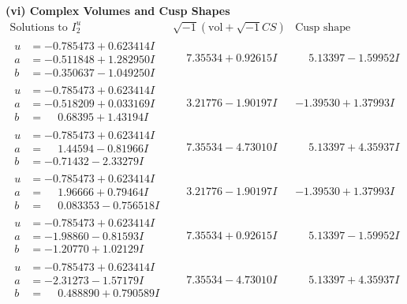 \documentclass[1p]{elsarticle_modified}
\theoremstyle{definition}
\newcommand{\I}{\sqrt{-1}}
\begin{document}
\newpage\flushleft \textbf{(vi) Complex Volumes and Cusp Shapes}
$$\begin{array}{c|c|c}  
\text{Solutions to }I^u_{2}& \I (\text{vol} + \sqrt{-1}CS) & \text{Cusp shape}\\
 \hline 
\begin{aligned}
u &= -0.785473 + 0.623414 I \\
a &= -0.511848 + 1.282950 I \\
b &= -0.350637 - 1.049250 I\end{aligned}
 & \phantom{-}7.35534 + 0.92615 I & \phantom{-}5.13397 - 1.59952 I \\ \hline\begin{aligned}
u &= -0.785473 + 0.623414 I \\
a &= -0.518209 + 0.033169 I \\
b &= \phantom{-}0.68395 + 1.43194 I\end{aligned}
 & \phantom{-}3.21776 - 1.90197 I & -1.39530 + 1.37993 I \\ \hline\begin{aligned}
u &= -0.785473 + 0.623414 I \\
a &= \phantom{-}1.44594 - 0.81966 I \\
b &= -0.71432 - 2.33279 I\end{aligned}
 & \phantom{-}7.35534 - 4.73010 I & \phantom{-}5.13397 + 4.35937 I \\ \hline\begin{aligned}
u &= -0.785473 + 0.623414 I \\
a &= \phantom{-}1.96666 + 0.79464 I \\
b &= \phantom{-}0.083353 - 0.756518 I\end{aligned}
 & \phantom{-}3.21776 - 1.90197 I & -1.39530 + 1.37993 I \\ \hline\begin{aligned}
u &= -0.785473 + 0.623414 I \\
a &= -1.98860 - 0.81593 I \\
b &= -1.20770 + 1.02129 I\end{aligned}
 & \phantom{-}7.35534 + 0.92615 I & \phantom{-}5.13397 - 1.59952 I \\ \hline\begin{aligned}
u &= -0.785473 + 0.623414 I \\
a &= -2.31273 - 1.57179 I \\
b &= \phantom{-}0.488890 + 0.790589 I\end{aligned}
 & \phantom{-}7.35534 - 4.73010 I & \phantom{-}5.13397 + 4.35937 I \\ \hline\begin{aligned}

\end{aligned}
\end{array}$$
\end{document}
